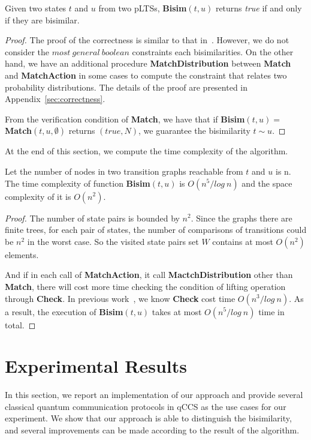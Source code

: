 \documentclass[a4paper,UKenglish,cleveref, autoref]{lipics-v2019}
\begin{document}
\begin{theorem}[Correctness]

Given two states $t$ and $u$ from two pLTSs, \textbf{Bisim}$(t,u)$ returns \textit{true} if and only if they are bisimilar.
\end{theorem} 
\begin{proof}
The proof of the correctness is similar to that in~\cite{DBLP:journals/tcs/HennessyL95}. However, we do not consider the $most\ general\ boolean$ constraints each bisimilarities. On the other hand, we have an additional procedure \textbf{MatchDistribution} between \textbf{Match} and \textbf{MatchAction} in some cases to compute the constraint that relates two probability distributions. The details of the proof are presented in Appendix~\ref{sec:correctness}. 

From the verification condition of \textbf{Match}, we have that if \textbf{Bisim}$(t,u)=$\textbf{Match}$(t,u,\emptyset)$ returns $(true, N)$, we guarantee the bisimilarity $t\sim u$.
\end{proof}

At the end of this section, we compute the time complexity of the algorithm.

\begin{theorem}[Complexity]
Let the number of nodes in two transition graphs reachable from $t$ and $u$ is n. The time complexity of function \textbf{Bisim}$(t,u)$ is $O(n^5/log\ n)$ and the space complexity of it is $O(n^2)$.
\end{theorem}
\begin{proof}
 The number of state pairs is bounded by $n^2$. Since the graphs there are finite trees, for each pair of states, the number of comparisons of transitions could be $n^2$ in the worst case. So the visited state pairs set $W$ contains at most $O(n^2)$ elements.

And if in each call of \textbf{MatchAction}, it call \textbf{MactchDistribution} other than \textbf{Match}, there will cost more time checking the condition of lifting operation through \textbf{Check}. In previous work~\cite{DD11}, we know \textbf{Check} cost time $O(n^3/log\ n)$. As a result, the execution of \textbf{Bisim}$(t,u)$ takes at most $O(n^5/log\ n)$ time in total.
\end{proof}

\section{Experimental Results}
\label{sec:experiment}
In this section, we report an implementation of our approach and provide several classical quantum communication protocols in qCCS as the use cases for our experiment. We show that our approach is able to distinguish the bisimilarity, and several improvements can be made according to the result of the algorithm.
\end{document}
